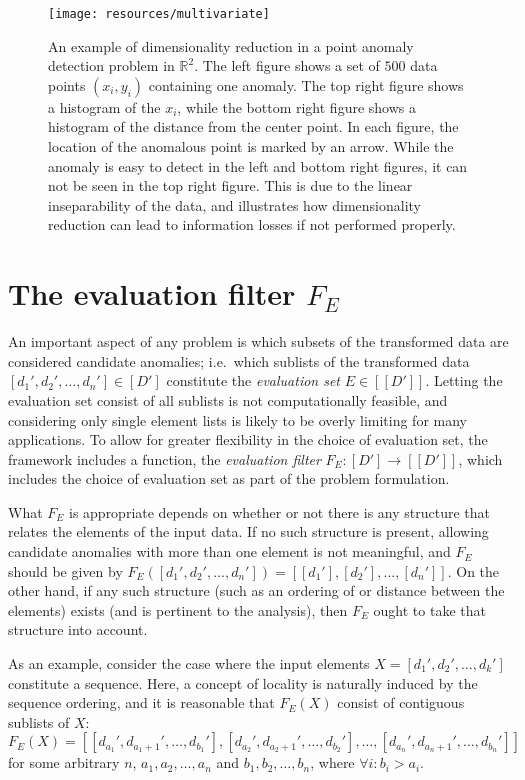 \begin{figure}[htb]
\begin{center}
\leavevmode
\texttt{[image: resources/multivariate]}
\end{center}
\caption{\small{An example of dimensionality reduction in a point anomaly detection problem in $\mathbb{R}^2$. The left figure shows a set of $500$ data points $(x_i, y_i)$ containing one anomaly. The top right figure shows a histogram of the $x_i$, while the bottom right figure shows a histogram of the distance from the center point. In each figure, the location of the anomalous point is marked by an arrow. While the anomaly is easy to detect in the left and bottom right figures, it can not be seen in the top right figure. This is due to the linear inseparability of the data, and illustrates how dimensionality reduction can lead to information losses if not performed properly.}}
\label{fig:dimensionality_reduction}
\end{figure}

\section{The evaluation filter $F_E$}

An important aspect of any problem is which subsets of the transformed data are considered candidate anomalies; i.e.\ which sublists of the transformed data $[d_1', d_2', \dots, d_n'] \in [D']$ constitute the \emph{evaluation set} $E \in [[D']]$. Letting the evaluation set consist of all sublists is not computationally feasible, and considering only single element lists is likely to be overly limiting for many applications. To allow for greater flexibility in the choice of evaluation set, the framework includes a function, the \emph{evaluation filter} $F_E: [D'] \rightarrow [[D']]$, which includes the choice of evaluation set as part of the problem formulation.

What $F_E$ is appropriate depends on whether or not there is any structure that relates the elements of the input data. If no such structure is present, allowing candidate anomalies with more than one element is not meaningful, and $F_E$ should be given by $F_E([d_1', d_2', \dots, d_n']) = [[d_1'], [d_2'], \dots, [d_n']]$. On the other hand, if any such structure (such as an ordering of or distance between the elements) exists (and is pertinent to the analysis), then $F_E$ ought to take that structure into account.

As an example, consider the case where the input elements $X = [d_1', d_2', \dots, d_k']$ constitute a sequence. Here, a concept of locality is naturally induced by the sequence ordering, and it is reasonable that $F_E(X)$ consist of contiguous sublists of $X$:
\[
    F_E(X) = [[d_{a_1}', d_{a_1 + 1}', \dots, d_{b_1}'], [d_{a_2}', d_{a_2 + 1}', \dots, d_{b_2}'], \dots, [d_{a_n}', d_{a_n + 1}', \dots, d_{b_n}']]
\]
for some arbitrary $n$, $a_1, a_2, \dots, a_n$ and $b_1, b_2, \dots, b_n$, where $\forall i: b_i > a_i$.

